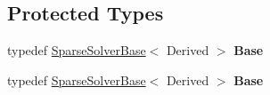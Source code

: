 \subsection*{Protected Types}
\begin{DoxyCompactItemize}
\item 
\mbox{\label{class_eigen_1_1_pastix_base_af66956d5d8ee804ee0d4d66f56f6baec}} 
typedef \hyperlink{group___sparse_core___module_class_eigen_1_1_sparse_solver_base}{Sparse\+Solver\+Base}$<$ Derived $>$ {\bfseries Base}
\item 
\mbox{\label{class_eigen_1_1_pastix_base_af66956d5d8ee804ee0d4d66f56f6baec}} 
typedef \hyperlink{group___sparse_core___module_class_eigen_1_1_sparse_solver_base}{Sparse\+Solver\+Base}$<$ Derived $>$ {\bfseries Base}
\end{DoxyCompactItemize}

